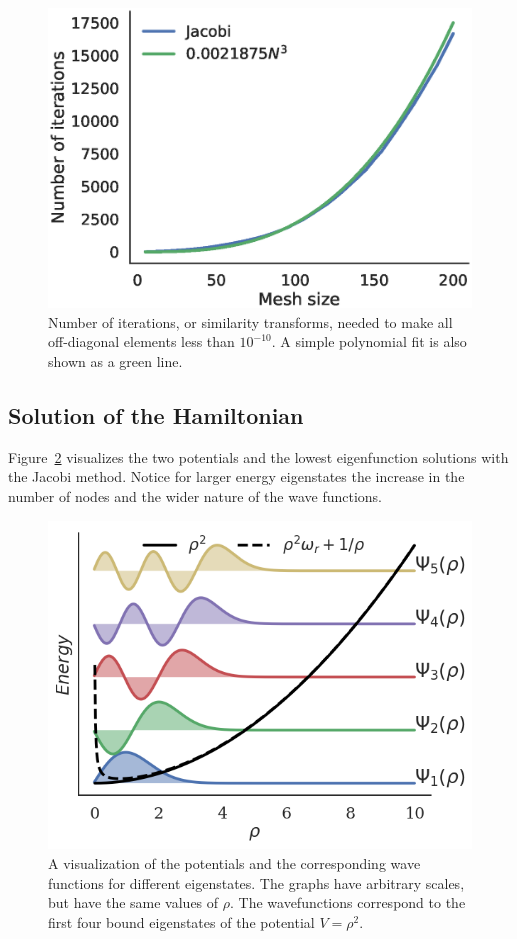 \documentclass[aps,reprint]{revtex4-1}
\begin{document}
\begin{figure}[H]
  \centering
  \includegraphics[width=\columnwidth]{figures/iterations.eps}
  \caption{\label{fig:juliaiterations} Number of iterations, or similarity
    transforms, needed to make all off-diagonal elements less than \(10^{-10}\).
  A simple polynomial fit is also shown as a green line.}
\end{figure}

\subsection{Solution of the Hamiltonian}
\label{sec:hamiltonsol}

Figure~\ref{fig:wavefunctions} visualizes the two potentials and the lowest
eigenfunction solutions with the Jacobi method. Notice for larger energy
eigenstates the increase in the number of nodes and the wider nature of
the wave functions.

\begin{figure}[H]
  \centering
  \includegraphics[width=\columnwidth]{figures/wavefunctions.png}
  \caption{\label{fig:wavefunctions} A visualization of the potentials and the
    corresponding wave functions for different eigenstates. The graphs have
    arbitrary scales, but have the same values of $\rho$. The wavefunctions
    correspond to
    the first four bound eigenstates of the potential \(V=\rho^{2}\).}
\end{figure}
\end{document}
